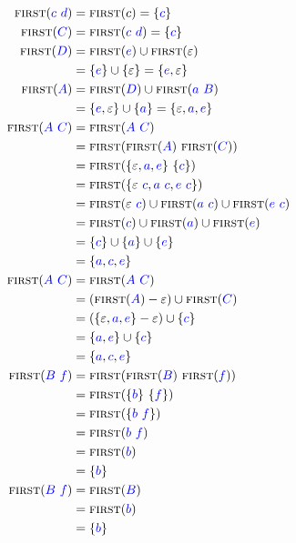 \documentclass{article}
\newcommand{\FIRST}{\textsc{first}}
\newcommand{\Symbol}[1]{\textcolor{blue}{#1}}
\newcommand{\Null}{\varepsilon}
\newcommand{\Seq}{\ }
\begin{document}
\begin{align*}
  \FIRST(\Symbol{c} \Seq \Symbol{d}) &= \FIRST(c) = \{\Symbol{c}\} \\
  \FIRST(\Symbol{C}) &= \FIRST(\Symbol{c} \Seq \Symbol{d}) = \{\Symbol{c}\} \\
  \FIRST(\Symbol{D}) &= \FIRST(\Symbol{e}) \cup \FIRST(\Null) \\
            &= \{\Symbol{e}\} \cup \{\Null\} = \{\Symbol{e}, \Null\} \\
  \FIRST(\Symbol{A}) &= \FIRST(\Symbol{D}) \cup \FIRST(\Symbol{a} \Seq \Symbol{B}) \\
            &= \{\Symbol{e}, \Null\} \cup \{\Symbol{a}\} = \{\Null, \Symbol{a}, \Symbol{e}\} \\
  \FIRST(\Symbol{A} \Seq \Symbol{C}) &= \FIRST(\Symbol{A} \Seq \Symbol{C}) \\
            &= \FIRST(\FIRST(\Symbol{A}) \Seq \FIRST(\Symbol{C})) \\
            &= \FIRST(\{\Null, \Symbol{a}, \Symbol{e}\} \Seq \{\Symbol{c}\})\\
            &= \FIRST(\{\Null \Seq \Symbol{c}, \Symbol{a} \Seq \Symbol{c}, \Symbol{e} \Seq \Symbol{c}\})\\
            &= \FIRST(\Null \Seq \Symbol{c}) \cup \FIRST(\Symbol{a} \Seq \Symbol{c}) \cup \FIRST(\Symbol{e} \Seq \Symbol{c}) \\
            &= \FIRST(\Symbol{c}) \cup \FIRST(\Symbol{a}) \cup \FIRST(\Symbol{e}) \\
            &= \{\Symbol{c}\} \cup \{\Symbol{a}\} \cup \{\Symbol{e}\} \\
            &= \{\Symbol{a}, \Symbol{c}, \Symbol{e}\}\\
  \FIRST(\Symbol{A} \Seq \Symbol{C}) &= \FIRST(\Symbol{A} \Seq \Symbol{C}) \\
            &= (\FIRST(\Symbol{A}) - \Null) \cup \FIRST(\Symbol{C}) \\
            &= (\{\Null, \Symbol{a}, \Symbol{e}\} - \Null) \cup \{\Symbol{c}\} \\
            &= \{\Symbol{a}, \Symbol{e}\} \cup \{\Symbol{c}\}\\
            &= \{\Symbol{a}, \Symbol{c}, \Symbol{e}\}\\
  \FIRST(\Symbol{B} \Seq \Symbol{f}) &= \FIRST(\FIRST(\Symbol{B}) \Seq \FIRST(\Symbol{f})) \\
            &= \FIRST(\{\Symbol{b}\} \Seq \{\Symbol{f}\})\\
            &= \FIRST(\{\Symbol{b} \Seq \Symbol{f}\})\\
            &= \FIRST(\Symbol{b} \Seq \Symbol{f})\\
            &= \FIRST(\Symbol{b})\\
            &= \{\Symbol{b}\}\\
  \FIRST(\Symbol{B} \Seq \Symbol{f}) &= \FIRST(\Symbol{B})\\
            &= \FIRST(\Symbol{b})\\
            &= \{\Symbol{b}\}
\end{align*}
\end{document}
